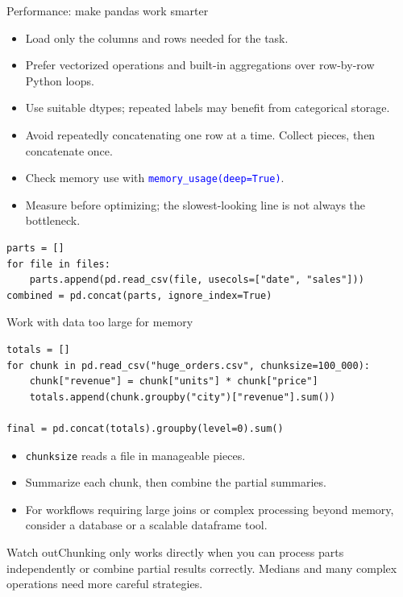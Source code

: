 \documentclass[aspectratio=169,10pt]{beamer}
\newcommand{\pitfall}[1]{\begin{alertblock}{Watch out}#1\end{alertblock}}
\newcommand{\method}[1]{\texttt{\textcolor{Blue}{#1}}}
\begin{document}
\begin{frame}[fragile]{Performance: make pandas work smarter}
\begin{itemize}
\item Load only the columns and rows needed for the task.
\item Prefer vectorized operations and built-in aggregations over row-by-row Python loops.
\item Use suitable dtypes; repeated labels may benefit from categorical storage.
\item Avoid repeatedly concatenating one row at a time. Collect pieces, then concatenate once.
\item Check memory use with \method{memory\_usage(deep=True)}.
\item Measure before optimizing; the slowest-looking line is not always the bottleneck.
\end{itemize}
\begin{lstlisting}
parts = []
for file in files:
    parts.append(pd.read_csv(file, usecols=["date", "sales"]))
combined = pd.concat(parts, ignore_index=True)
\end{lstlisting}
\end{frame}

\begin{frame}[fragile]{Work with data too large for memory}
\begin{lstlisting}
totals = []
for chunk in pd.read_csv("huge_orders.csv", chunksize=100_000):
    chunk["revenue"] = chunk["units"] * chunk["price"]
    totals.append(chunk.groupby("city")["revenue"].sum())

final = pd.concat(totals).groupby(level=0).sum()
\end{lstlisting}
\begin{itemize}
\item \texttt{chunksize} reads a file in manageable pieces.
\item Summarize each chunk, then combine the partial summaries.
\item For workflows requiring large joins or complex processing beyond memory, consider a database or a scalable dataframe tool.
\end{itemize}
\pitfall{Chunking only works directly when you can process parts independently or combine partial results correctly. Medians and many complex operations need more careful strategies.}
\end{frame}
\end{document}
